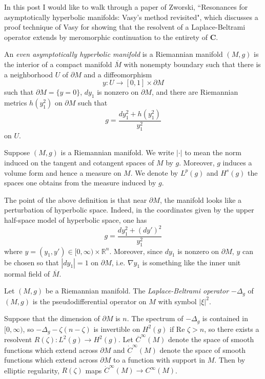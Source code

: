 \documentclass[12pt]{article}
\newcommand{\RR}{\mathbb{R}}
\begin{document}

In this post I would like to walk through a paper of Zworski, ``Resonances for asymptotically hyperbolic manifolds: Vasy's method revisited", which discusses a proof technique of Vasy for showing that the resolvent of a Laplace-Beltrami operator extends by meromorphic continuation to the entirety of $\mathbf C$.

\begin{definition}
An \emph{even asymptotically hyperbolic manifold} is a Riemannian manifold $(M, g)$ is the interior of a compact manifold $\overline M$ with nonempty boundary such that there is a neighborhood $U$ of $\partial M$ and a diffeomorphism
$$y: U \to [0, 1] \times \partial M$$
such that $\partial M = \{y = 0\}$, $dy_1$ is nonzero on $\partial M$, and there are Riemannian metrics $h(y_1^2)$ on $\partial M$ such that
$$g = \frac{dy_1^2 + h(y_1^2)}{y_1^2}$$
on $U$.
\end{definition}

Suppose $(M, g)$ is a Riemannian manifold.
We write $|\cdot|$ to mean the norm induced on the tangent and cotangent spaces of $M$ by $g$.
Moreover, $g$ induces a volume form and hence a measure on $M$.
We denote by $L^p(g)$ and $H^s(g)$ the spaces one obtains from the measure induced by $g$.

The point of the above definition is that near $\partial M$, the manifold looks like a perturbation of hyperbolic space. Indeed, in the coordinates given by the upper half-space model of hyperbolic space, one has
$$g = \frac{dy_1^2 + (dy')^2}{y_1^2}$$
where $y = (y_1, y') \in [0, \infty) \times \RR^n$.
Moreover, since $dy_1$ is nonzero on $\partial M$, $y$ can be chosen so that $|dy_1| = 1$ on $\partial M$, i.e. $\nabla y_1$ is something like the inner unit normal field of $\overline M$.

\begin{definition}
Let $(M, g)$ be a Riemannian manifold. The \emph{Laplace-Beltrami operator} $-\Delta_g$ of $(M, g)$ is the pseudodifferential operator on $M$ with symbol $|\xi|^2$.
\end{definition}

Suppose that the dimension of $\partial M$ is $n$.
The spectrum of $-\Delta_g$ is contained in $[0, \infty)$, so $-\Delta_g - \zeta(n - \zeta)$ is invertible on $H^2(g)$ if $\text{Re } \zeta > n$, so there exists a resolvent $R(\zeta): L^2(g) \to H^2(g)$.
Let $\overline C^\infty(M)$ denote the space of smooth functions which extend across $\partial M$ and $\dot C^\infty(M)$ denote the space of smooth functions which extend across $\partial M$ to a function with support in $M$.
Then by elliptic regularity, $R(\zeta)$ maps $\dot C^\infty(M) \to C^\infty(M)$.
\end{document}
